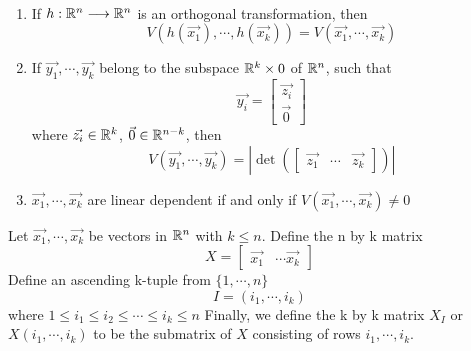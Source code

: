 \begin{theorem}\
    \begin{enumerate}
        \item If $h:\mathbb{R}^n\longrightarrow\mathbb{R}^n$ is an orthogonal transformation, then $$V(h(\vec{x_1}),\cdots,h(\vec{x_k}))=V(\vec{x_1},\cdots,\vec{x_k})$$
        \item If $\vec{y_1},\cdots,\vec{y_k}$ belong to the subspace $\mathbb{R}^k\times 0$ of $\mathbb{R}^n$, such that $$\vec{y_i}=\begin{bmatrix}
            \vec{z_i}\\
            \vec{0}
        \end{bmatrix}$$
        where $\vec{z_i}\in\mathbb{R}^k$, $\vec{0}\in\mathbb{R}^{n-k}$, then 
        $$V(\vec{y_1},\cdots,\vec{y_k})=|\det(\begin{bmatrix}
            \vec{z_1} & \cdots & \vec{z_k}
        \end{bmatrix})|$$
        \item $\vec{x_1},\cdots,\vec{x_k}$ are linear dependent if and only if $V(\vec{x_1},\cdots,\vec{x_k})\neq0$
    \end{enumerate}
\end{theorem}

\begin{definition}
    Let $\vec{x_1},\cdots,\vec{x_k}$ be vectors in $\mathbb{R}^n$ with $k\leq n$. Define the n by k matrix $$X=\begin{bmatrix}
        \vec{x_1} & \cdots \vec{x_k}
    \end{bmatrix}$$
    Define an ascending k-tuple from $\{1,\cdots,n\}$ $$I=(i_1,\cdots,i_k)$$
    where $1\leq i_1\leq i_2\leq \cdots \leq i_k\leq n$
    Finally, we define the k by k matrix $X_I$ or $X(i_1,\cdots,i_k)$ to be the submatrix of $X$ consisting of rows $i_1,\cdots,i_k$.
\end{definition}

